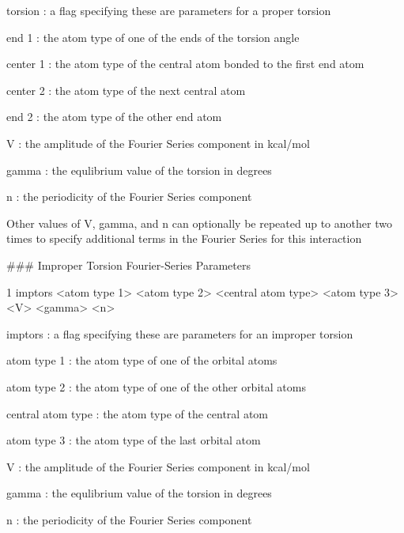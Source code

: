 \begin{DoxyItemize}
\item {\ttfamily torsion} \+: a flag specifying these are parameters for a proper torsion
\item {\ttfamily end 1} \+: the atom type of one of the ends of the torsion angle
\item {\ttfamily center 1} \+: the atom type of the central atom bonded to the first end atom
\item {\ttfamily center 2} \+: the atom type of the next central atom
\item {\ttfamily end 2} \+: the atom type of the other end atom
\item {\ttfamily V} \+: the amplitude of the Fourier Series component in kcal/mol
\item {\ttfamily gamma} \+: the equlibrium value of the torsion in degrees
\item {\ttfamily n} \+: the periodicity of the Fourier Series component
\item Other values of {\ttfamily V}, {\ttfamily gamma}, and {\ttfamily n} can optionally be repeated up to another two times to specify additional terms in the Fourier Series for this interaction
\end{DoxyItemize}

\#\#\# Improper Torsion Fourier-\/\+Series Parameters 
\begin{DoxyCode}
1 imptors <atom type 1> <atom type 2> <central atom type> <atom type 3> <V> <gamma> <n>
\end{DoxyCode}



\begin{DoxyItemize}
\item {\ttfamily imptors} \+: a flag specifying these are parameters for an improper torsion
\item {\ttfamily atom type 1} \+: the atom type of one of the orbital atoms
\item {\ttfamily atom type 2} \+: the atom type of one of the other orbital atoms
\item {\ttfamily central atom type} \+: the atom type of the central atom
\item {\ttfamily atom type 3} \+: the atom type of the last orbital atom
\item {\ttfamily V} \+: the amplitude of the Fourier Series component in kcal/mol
\item {\ttfamily gamma} \+: the equlibrium value of the torsion in degrees
\item {\ttfamily n} \+: the periodicity of the Fourier Series component
\end{DoxyItemize}

